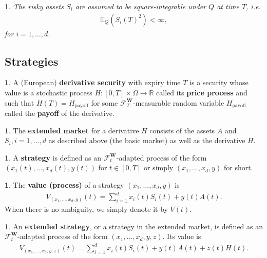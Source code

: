 \documentclass[english]{article}
\newcommand{\comment}[1]{\color{blue}#1\color{black}}
\numberwithin{equation}{section}
\numberwithin{figure}{section}
\theoremstyle{bolddescit}
\theoremstyle{definition}
\newtheorem{definition}[theorem]{\protect\definitionname}
\theoremstyle{definition}
\theoremstyle{plain}
\theoremstyle{plain}
\theoremstyle{bolddesc}
\newtheorem{assumption}[theorem]{\protect\assumptionname}
\theoremstyle{plain}
\theoremstyle{remark}
\providecommand{\assumptionname}{Assumption}
\providecommand{\definitionname}{Definition}
\begin{document}
\begin{assumption}\label{ass:bs-stock-price-square-integrability}
  The risky assets $S_i$ are assumed to be square-integrable under $Q$ at time $T$, i.e.
  \begin{align*}
    \mathbb{E}_Q(S_i(T)^2) < \infty,
  \end{align*}
  for $i=1,\ldots,d$.
\end{assumption}

\subsection{Strategies}

\begin{definition}
  A (European) \textbf{derivative security} with expiry time $T$ is a security whose value is a stochastic process $H : [0,T] \times \Omega \to \mathbb{R}$ called its \textbf{price process} and such that $H(T) = H_\text{payoff}$ for some $\mathcal{F}^\mathbf{W}_T$-measurable random variable $H_\text{payoff}$ called the \textbf{payoff} of the derivative.
\end{definition}

\begin{definition}
  The \textbf{extended market} for a derivative $H$ consists of the assets $A$ and $S_i, i=1,\ldots,d$ as described above (the basic market) as well as the derivative $H$.
\end{definition}

\begin{definition}
  A \textbf{strategy} is defined as an $\mathcal{F}^\mathbf{W}_t$-adapted process of the form\\ $(x_1(t),\ldots,x_d(t),y(t))$ for $t \in [0,T]$ or simply $(x_1,\ldots,x_d,y)$ for short.
\end{definition}

\begin{definition}
  The \textbf{value (process)} of a strategy $(x_1,\ldots,x_d,y)$ is
  \begin{align*}
    V_{(x_1,\ldots,x_d,y)}(t) = \sum_{i=1}^d x_i(t) S_i(t) + y(t) A(t).
  \end{align*}
  When there is no ambiguity, we simply denote it by $V(t)$.
\end{definition}

\begin{definition}
  An \textbf{extended strategy}, or a strategy in the extended market, is defined as an $\mathcal{F}^\mathbf{W}_t$-adapted process of the form $(x_1,\ldots,x_d,y,z)$. Its value is
  \begin{align*}
    V_{(x_1,\ldots,x_d,y,z)}(t)
    = \sum_{i=1}^d x_i(t) S_i(t) + y(t) A(t) + z(t) H(t).
  \end{align*}
\end{definition}
\end{document}
